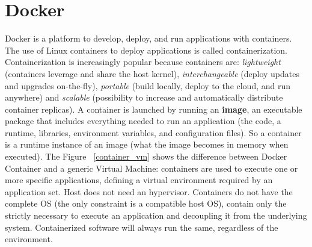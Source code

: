 \section{Docker}
Docker is a platform to develop, deploy, and run applications with containers. The use of Linux containers to deploy applications is called containerization. Containerization is increasingly popular because containers are: \textit{lightweight} (containers leverage and share the host kernel), \textit{interchangeable} (deploy updates and upgrades on-the-fly), \textit{portable} (build locally, deploy to the cloud, and run anywhere) and \textit{scalable} (possibility to increase and automatically distribute container replicas).\newline
A container is launched by running an \textbf{image}, an executable package that includes everything needed to run an application (the code, a runtime, libraries, environment variables, and configuration files). So a container is a runtime instance of an image (what the image becomes in memory when executed).\newline
The Figure ~\ref{container_vm} shows the difference between Docker Container and a generic Virtual Machine: containers are used to execute one or more specific applications, defining a virtual environment required by an application set. Host does not need an hypervisor. Containers do not have the complete OS (the only constraint is a compatible host OS), contain only the strictly necessary to execute an application and decoupling it from the underlying system. Containerized software will always run the same, regardless of the environment.
